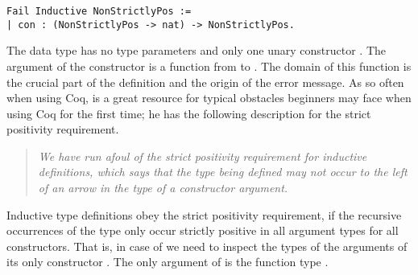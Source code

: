 \begin{verbatim}
Fail Inductive NonStrictlyPos :=
| con : (NonStrictlyPos -> nat) -> NonStrictlyPos.
\end{verbatim}

The data type  has no type parameters and only one unary constructor .
The argument of the constructor  is a function from  to .
The domain of this function is the crucial part of the definition and the origin of the error message.
As so often when using Coq, \citet{chlipala2011certified} is a great resource for typical obstacles beginners may face when using Coq for the first time; he has the following description for the strict positivity requirement.

\begin{quote}
\emph{We have run afoul of the strict positivity requirement for inductive definitions, which says that the type being defined may not occur to the left of an arrow in the type of a constructor argument.}
\end{quote}

Inductive type definitions obey the strict positivity requirement, if the recursive occurrences of the type only occur strictly positive in all argument types for all constructors.
That is, in case of  we need to inspect the types of the arguments of its only constructor .
The only argument of  is the function type .

